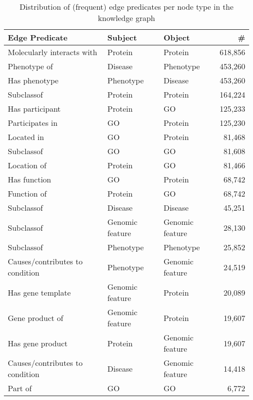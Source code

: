 \begin{table}
    \centering
    \begin{tabular}{lllr}
        \toprule
        \textbf{Edge Predicate} & \textbf{Subject} & \textbf{Object} & \textbf{\#} \\      
        \midrule
        Molecularly interacts with & Protein & Protein & 618,856 \\
        Phenotype of & Disease & Phenotype & 453,260 \\
        Has phenotype & Phenotype & Disease & 453,260 \\
        Subclassof & Protein & Protein & 164,224 \\
        Has participant & Protein & GO & 125,233 \\
        Participates in & GO & Protein & 125,230 \\
        Located in & GO & Protein & 81,468 \\
        Subclassof & GO & GO & 81,608 \\
        Location of & Protein & GO & 81,466 \\
        Has function & GO & Protein & 68,742 \\
        Function of & Protein & GO & 68,742 \\
        Subclassof & Disease & Disease & 45,251 \\
        Subclassof & Genomic feature & Genomic feature & 28,130 \\
        Subclassof & Phenotype & Phenotype & 25,852 \\
        Causes/contributes to condition & Phenotype & Genomic feature & 24,519 \\
        Has gene template & Genomic feature & Protein & 20,089 \\
        Gene product of & Genomic feature & Protein & 19,607 \\
        Has gene product & Protein & Genomic feature & 19,607 \\
        Causes/contributes to condition & Disease & Genomic feature & 14,418 \\
        Part of & GO & GO & 6,772 \\
        \bottomrule
    \end{tabular} 
    \caption{Distribution of (frequent) edge predicates per node type in the knowledge graph}   
    \label{tab:edgedistrib}
\end{table}